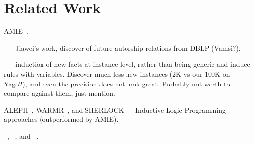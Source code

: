 \section{Related Work}
AMIE~\cite{galarraga2015fast}.

~\cite{zhu2011mining} -- Jiawei's work, discover of future autorship relations from DBLP (Vamsi?).

~\cite{abedjan2014amending} -- induction of new facts at instance level, rather than being generic and induce rules with variables. Discover much less new instances (2K vs our 100K on Yago2), and even the precision does not look great. Probably not worth to compare against them, just mention.

ALEPH~\cite{muggleton1995inverse}, WARMR~\cite{dehaspe1999discovery}, and SHERLOCK~\cite{schoenmackers2010learning} -- Inductive Logic Programming approaches (outperformed by AMIE).

\yago~\cite{suchanek2007yago}, \dbpedia~\cite{bizer2009dbpedia}, and \wikidata~\cite{vrandevcic2014wikidata}.